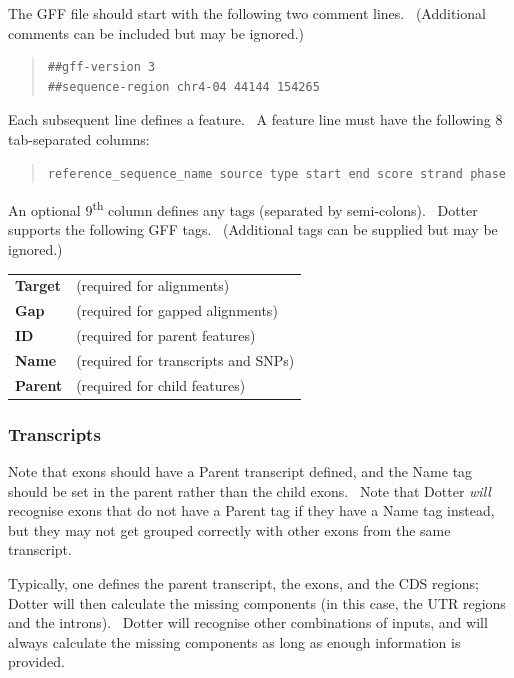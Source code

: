 \documentclass[letterpaper]{article}
\begin{document}
{The GFF file should start with the following two comment lines.
\ (Additional comments can be included but may be ignored.)

\bigskip

\begin{quote}
\begin{verbatim}
##gff-version 3
##sequence-region chr4-04 44144 154265
\end{verbatim}
\end{quote}
Each subsequent line defines a feature. \ A feature line must have the
following 8 tab-separated columns:
\begin{quote}
\begin{verbatim}
reference_sequence_name source type start end score strand phase
\end{verbatim}
\end{quote}
An optional 9\textsuperscript{th} column defines any tags (separated by
semi-colons). \ Dotter supports the following GFF tags. \ (Additional
tags can be supplied but may be ignored.)

\begin{center}
\begin{supertabular}{p{2.802cm}p{10.704cm}}
\textbf{Target } & (required for alignments) \\
\textbf{Gap} & (required for gapped alignments) \\
\textbf{ID } & (required for parent features) \\
\textbf{Name } & (required for transcripts and SNPs) \\
\textbf{Parent } & (required for child features) \\
\end{supertabular}
\end{center}
}

{\color[rgb]{0.30980393,0.5058824,0.7411765}\subsubsection{Transcripts}}
{Note that exons should have a Parent transcript defined, and the Name
tag should be set in the parent rather than the child exons. \ Note
that Dotter \textit{will} recognise exons that do not have a Parent tag
if they have a Name tag instead, but they may not get grouped correctly
with other exons from the same transcript.}

\bigskip

{Typically, one defines the parent transcript, the exons, and the CDS
regions; Dotter will then calculate the missing components (in this
case, the UTR regions and the introns). \ Dotter will recognise other
combinations of inputs, and will always calculate the missing
components as long as enough information is provided. }
\end{document}
